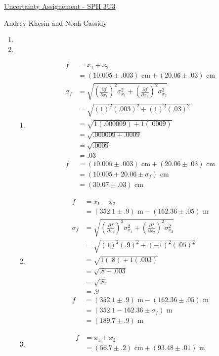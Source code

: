 \documentclass{article}
\begin{document}
\centerline{\sc \large \underline{Uncertainty Assignement - SPH 3U3}}
\centerline{\sc Andrey Khesin and Noah Cassidy}
\centerline{}

\begin{enumerate}
\item 
\item
\begin{enumerate}
\item
\begin{align*}
f &= x_1 + x_2\\
&= (10.005 \pm .003)\text{ cm} + (20.06 \pm .03)\text{ cm}\\
\sigma_{f} &= \sqrt{(\frac{\partial f}{\partial x_1})^2\sigma_{x_1}^2 + (\frac{\partial f}{\partial x_2})^2\sigma_{x_2}^2}\\
&= \sqrt{(1)^2(.003)^2 + (1)^2(.03)^2}\\
&= \sqrt{1(.000009) + 1(.0009)}\\
&= \sqrt{.000009 + .0009}\\
&= \sqrt{.0009}\\
&= .03\\
f &= (10.005 \pm .003)\text{ cm} + (20.06 \pm .03)\text{ cm}\\
&= (10.005 + 20.06 \pm \sigma_{f})\text{ cm}\\
&= (30.07 \pm .03)\text{ cm}
\end{align*}
\item
\begin{align*}
f &= x_1 - x_2\\
&= (352.1 \pm .9)\text{ m} - (162.36 \pm .05)\text{ m}\\
\sigma_{f} &= \sqrt{(\frac{\partial f}{\partial x_1})^2\sigma_{x_1}^2 + (\frac{\partial f}{\partial x_2})^2\sigma_{x_2}^2}\\
&= \sqrt{(1)^2(.9)^2 + (-1)^2(.05)^2}\\
&= \sqrt{1(.8) + 1(.003)}\\
&= \sqrt{.8 + .003}\\
&= \sqrt{.8}\\
&= .9\\
f &= (352.1 \pm .9)\text{ m} - (162.36 \pm .05)\text{ m}\\
&= (352.1 - 162.36 \pm \sigma_{f})\text{ m}\\
&= (189.7 \pm .9)\text{ m}
\end{align*}
\item
\begin{align*}
f &= x_1 + x_2\\
&= (56.7 \pm .2)\text{ cm} + (93.48 \pm .01)\text{ m}\\

\end{align*}
\end{enumerate}
\end{enumerate}
\end{document}
